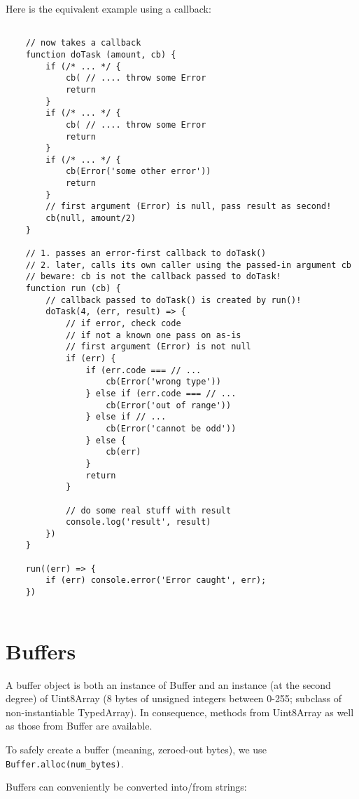 \documentclass{scrartcl}
\begin{document}
Here is the equivalent example using a callback:

\begin{lstlisting}[style=ES6]

    // now takes a callback
    function doTask (amount, cb) {
        if (/* ... */ {
            cb( // .... throw some Error
            return
        }
        if (/* ... */ {
            cb( // .... throw some Error
            return
        }
        if (/* ... */ {
            cb(Error('some other error'))
            return
        }
        // first argument (Error) is null, pass result as second!
        cb(null, amount/2)
    }

    // 1. passes an error-first callback to doTask()
    // 2. later, calls its own caller using the passed-in argument cb
    // beware: cb is not the callback passed to doTask!
    function run (cb) {
        // callback passed to doTask() is created by run()!
        doTask(4, (err, result) => {
            // if error, check code
            // if not a known one pass on as-is
            // first argument (Error) is not null
            if (err) {
                if (err.code === // ...
                    cb(Error('wrong type'))
                } else if (err.code === // ...
                    cb(Error('out of range'))
                } else if // ...
                    cb(Error('cannot be odd'))
                } else {
                    cb(err)
                }
                return
            }

            // do some real stuff with result
            console.log('result', result)
        })
    }

    run((err) => {
        if (err) console.error('Error caught', err);
    })


\end{lstlisting}

\section{Buffers}

A buffer object is both an instance of Buffer and an instance (at the second degree) of Uint8Array (8 bytes of unsigned integers between 0-255; subclass of non-instantiable TypedArray).
In consequence, methods from Uint8Array as well as those from Buffer are available.

To safely create a buffer (meaning, zeroed-out bytes), we use \lstinline|Buffer.alloc(num_bytes)|.

Buffers can conveniently be converted into/from strings:
\end{document}
